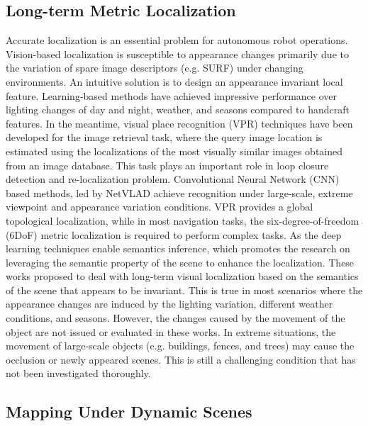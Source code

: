 \subsection{Long-term Metric Localization}
Accurate localization is an essential problem for autonomous robot operations. Vision-based localization is susceptible to appearance changes primarily due to the variation of spare image descriptors (e.g. SURF\cite{bay2008speeded}) under changing environments. An intuitive solution is to design an appearance invariant local feature. Learning-based methods have achieved impressive performance\cite{detone2018superpoint,revaud2019r2d2,sun2021robust,gridseth2021keeping} over lighting changes of day and night, weather, and seasons compared to handcraft features\cite{rublee2011orb,bay2008speeded}. In the meantime, visual place recognition (VPR) techniques have been developed for the image retrieval task, where the query image location is estimated using the localizations of the most visually similar images obtained from an image database. This task plays an important role in loop closure detection and re-localization problem. Convolutional Neural Network (CNN) based methods, led by NetVLAD\cite{arandjelovic2016netvlad} achieve recognition under large-scale, extreme viewpoint and appearance variation conditions. VPR provides a global topological localization, while in most navigation tasks, the six-degree-of-freedom (6DoF) metric localization is required to perform complex tasks. As the deep learning techniques enable semantics inference, which promotes the research on leveraging the semantic property of the scene to enhance the localization\cite{larsson2019fine,stenborg2018long}. These works proposed to deal with long-term visual localization based on the semantics of the scene that appears to be invariant. This is true in most scenarios where the appearance changes are induced by the lighting variation, different weather conditions, and seasons. However, the changes caused by the movement of the object are not issued or evaluated in these works. In extreme situations, the movement of large-scale objects (e.g. buildings, fences, and trees) may cause the occlusion or newly appeared scenes. This is still a challenging condition that has not been investigated thoroughly.



\subsection{Mapping Under Dynamic Scenes}

